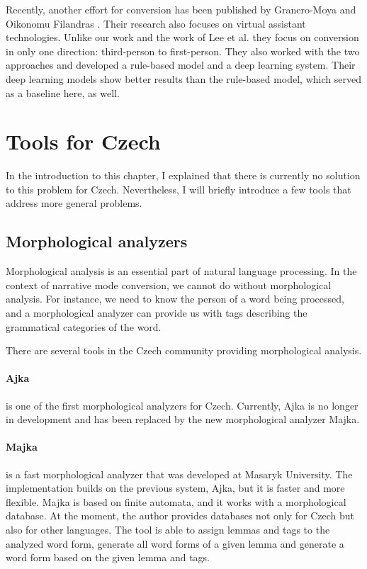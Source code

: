 Recently, another effort for conversion has been published by Granero-Moya and Oikonomu Filandras \cite{granero-moya-oikonomou-filandras-2021-taking}. Their research also focuses on virtual assistant technologies. Unlike our work and the work of Lee et al. they focus on conversion in only one direction: third-person to first-person. They also worked with the two approaches and developed a rule-based model and a deep learning system. Their deep learning models show better results than the rule-based model, which served as a baseline here, as well.

\section{Tools for Czech}

In the introduction to this chapter, I explained that there is currently no solution to this problem for Czech. Nevertheless, I will briefly introduce a few tools that address more general problems.

\subsection{Morphological analyzers}

Morphological analysis is an essential part of natural language processing. In the context of narrative mode conversion, we cannot do without morphological analysis. For instance, we need to know the person of a word being processed, and a morphological analyzer can provide us with tags describing the grammatical categories of the word.

There are several tools in the Czech community providing morphological analysis.

\paragraph{Ajka}

is one of the first morphological analyzers for Czech. Currently, Ajka is no longer in development and has been replaced by the new morphological analyzer Majka. \cite{Sedlacekthesis}

\paragraph{Majka}

is a fast morphological analyzer that was developed at Masaryk University. The implementation builds on the previous system, Ajka, but it is faster and more flexible. Majka is based on finite automata, and it works with a morphological database. At the moment, the author provides databases not only for Czech but also for other languages. The tool is able to assign lemmas and tags to the analyzed word form, generate all word forms of a given lemma and generate a word form based on the given lemma and tags. \cite{majka}

